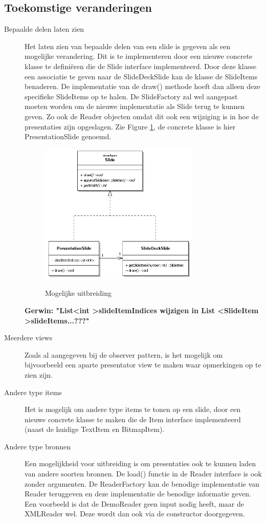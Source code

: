 \documentclass[a4paper]{article}
\begin{document}
\subsection{Toekomstige veranderingen}
\begin{description}
\item[Bepaalde delen laten zien] Het laten zien van bepaalde delen van een slide is gegeven als een mogelijke verandering. Dit is te implementeren door een nieuwe concrete klasse te definiëren die de Slide interface implementeerd. Door deze klasse een associatie te geven naar de SlideDeckSlide kan de klasse de SlideItems benaderen. De implementatie van de draw() methode hoeft dan alleen deze specifieke SlideItems op te halen. De SlideFactory zal wel aangepast moeten worden om de nieuwe implementatie als Slide terug te kunnen geven. Zo ook de Reader objecten omdat dit ook een wijziging is in hoe de presentaties zijn opgeslagen. Zie Figure \ref{fig:mogelijkeuitbreiding}, de concrete klasse is hier PresentationSlide genoemd.
\begin{figure}[htbp]
\caption{Mogelijke uitbreiding}
\centering
\includegraphics[width=0.75\textwidth]{MogelijkeUitbreiding.PNG}
\label{fig:mogelijkeuitbreiding}
\end{figure}

\textbf{Gerwin: "List\textless int \textgreater slideItemIndices wijzigen in List \textless SlideItem \textgreater slideItems...???"}

\item[Meerdere views] Zoals al aangegeven bij de observer pattern, is het mogelijk om bijvoorbeeld een aparte presentator view te maken waar opmerkingen op te zien zijn.
\item[Andere type items] Het is mogelijk om andere type items te tonen op een slide, door een nieuwe concrete klasse te maken die de Item interface implementeerd (naast de huidige TextItem en BitmapItem).
\item[Andere type bronnen] Een mogelijkheid voor uitbreiding is om presentaties ook te kunnen laden van andere soorten bronnen. De load() functie in de Reader interface is ook zonder argumenten. De ReaderFactory kan de benodige implementatie van Reader teruggeven en deze implementatie de benodige informatie geven. Een voorbeeld is dat de DemoReader geen input nodig heeft, maar de XMLReader wel. Deze wordt dan ook via de constructor doorgegeven.
\end{description}
\end{document}
